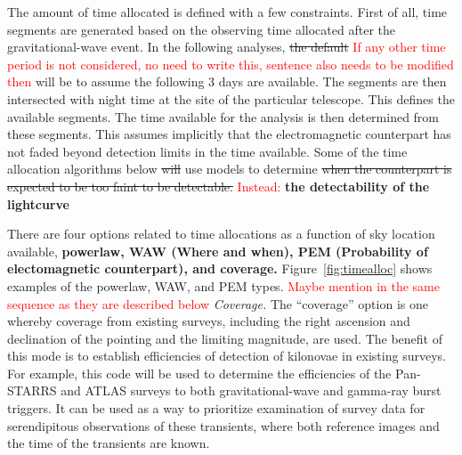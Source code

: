 \documentclass[twocolumn]{aastex62}
\begin{document}
The amount of time allocated is defined with a few constraints. 
First of all, time segments are generated based on the observing time allocated after the gravitational-wave event. 
In the following analyses, \sout{the default}
\textcolor{red}{If any other time period is not considered, no need to write this, sentence also needs to be modified then} will be to assume the following 3 days are available.
The segments are then intersected with night time at the site of the particular telescope.
This defines the available segments. 
The time available for the analysis is then determined from these segments.
This assumes implicitly that the electromagnetic counterpart has not faded beyond detection limits in the time available. 
Some of the time allocation algorithms below \sout{will} use models to determine \sout{when the counterpart is expected to be too faint to be detectable.}
\textcolor{red}{Instead:}\textbf{ the detectability of the lightcurve}

There are four options related to time allocations as a function of sky location available, \textbf{powerlaw, WAW (Where and when), PEM (Probability of electomagnetic counterpart), and coverage.} Figure~\ref{fig:timealloc} shows examples of the powerlaw, WAW, and PEM types.
\textcolor{red}{Maybe mention in the same sequence as they are described below}
\emph{Coverage.} The ``coverage'' option is one whereby coverage from existing surveys, including the right ascension and declination of the pointing and the limiting magnitude, are used. The benefit of this mode is to establish efficiencies of detection of kilonovae in existing surveys. For example, this code will be used to determine the efficiencies of the Pan-STARRS and ATLAS surveys to both gravitational-wave and gamma-ray burst triggers. It can be used as a way to prioritize examination of survey data for serendipitous observations of these transients, where both reference images and the time of the transients are known.
\end{document}
